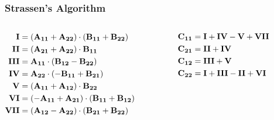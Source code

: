 \begin{frame}
  \frametitle{Strassen's Algorithm}

\begin{columns}
  \begin{column}{0.5\textwidth}
\large
\begin{math}
\begin{aligned}
\text{\textbf{I}}   &= (\mathbf{A_{11}} + \mathbf{A_{22}}) \cdot (\mathbf{B_{11}} + \mathbf{B_{22}}) \\
\text{\textbf{II}}  &= (\mathbf{A_{21}} + \mathbf{A_{22}}) \cdot \mathbf{B_{11}} \\
\text{\textbf{III}} &= \mathbf{A_{11}} \cdot (\mathbf{B_{12}}-\mathbf{B_{22}}) \\
\text{\textbf{IV}}  &= \mathbf{A_{22}} \cdot (-\mathbf{B_{11}}+\mathbf{B_{21}}) \\
\text{\textbf{V}}   &= (\mathbf{A_{11}} + \mathbf{A_{12}}) \cdot \mathbf{B_{22}} \\
\text{\textbf{VI}}  &= (-\mathbf{A_{11}} + \mathbf{A_{21}}) \cdot (\mathbf{B_{11}} + \mathbf{B_{12}}) \\
\text{\textbf{VII}} &= (\mathbf{A_{12}} - \mathbf{A_{22}}) \cdot (\mathbf{B_{21}} + \mathbf{B_{22}}) \\
\end{aligned}
\end{math}

\end{column}

\begin{column}{0.5\textwidth}
  \large
  \begin{math}
  \begin{aligned}
  \mathbf{C_{11}} &= \text{\textbf{I}} + \text{\textbf{IV}} - \text{\textbf{V}} + \text{\textbf{VII}} \\
  \mathbf{C_{21}} &= \text{\textbf{II}} + \text{\textbf{IV}} \\
  \mathbf{C_{12}} &= \text{\textbf{III}} + \text{\textbf{V}}\\
  \mathbf{C_{22}} &= \text{\textbf{I}} + \text{\textbf{III}} - \text{\textbf{II}} + \text{\textbf{VI}} \\
  \end{aligned}
  \end{math}

\end{column}
\end{columns}

\end{frame}

